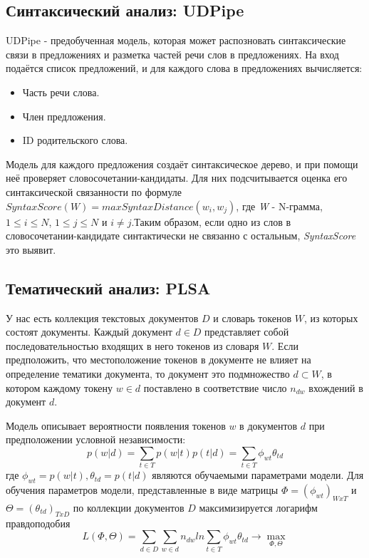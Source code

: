 \subsection*{Синтаксический анализ: UDPipe}

UDPipe - предобученная модель, которая может распозновать синтаксические связи в предложениях и разметка частей речи слов в предложениях. На вход подаётся список предложений, и для каждого слова в предложениях вычисляется:

\begin{itemize}
    \item Часть речи слова.
    \item Член предложения.
    \item ID родительского слова.
\end{itemize}

Модель для каждого предложения создаёт синтаксическое дерево, и при помощи неё проверяет словосочетании-кандидаты. Для них подсчитывается оценка его синтаксической связанности по формуле $SyntaxScore(W) = max SyntaxDistance(w_{i}, w_{j})$, где \textit{W} - N-грамма, $1 \leq i \leq N$, $1 \leq j \leq N$ и $i \neq j$.Таким образом, если одно из слов в словосочетании-кандидате синтактически не связанно с остальным, \textit{SyntaxScore} это выявит.

\subsection*{Тематический анализ: PLSA}

У нас есть коллекция текстовых документов $D$ и словарь токенов $W$, из которых состоят документы. Каждый документ $d \in D$ представляет собой последовательностью входящих в него токенов из словаря $W$. Если предположить, что местоположение токенов в документе не влияет на определение тематики документа, то документ это подмножество $d \subset W$, в котором каждому токену $w \in d$ поставлено в соответствие число $n_{dw}$ вхождений в документ $d$.

Модель описывает вероятности появления токенов $w$ в документов $d$ при предположении условной независимости:
$$p(w|d) = \sum_{t \in T} p(w|t)p(t|d) = \sum_{t \in T} \phi_{wt} \theta_{td}$$
где $\phi_{wt} = p(w|t), \theta_{td} = p(t|d)$ являются обучаемыми параметрами модели. Для обучения параметров модели, представленные в виде матрицы $\Phi = (\phi_{wt})_{WxT}$ и $\Theta = (\theta_{td})_{TxD}$ по коллекции документов $D$ максимизируется логарифм правдоподобия
$$L(\Phi, \Theta) = \sum_{d \in D} \sum_{w \in d} n_{dw} ln \sum_{t \in T} \phi_{wt} \theta_{td} \rightarrow \max_{\Phi, \Theta}$$

